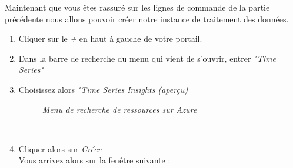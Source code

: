 Maintenant que vous êtes rassuré sur les lignes de commande de la partie précédente nous allons pouvoir créer notre instance de traitement des données.\\
\begin{enumerate}
	\item Cliquer sur le \textit{+} en haut à gauche de votre portail.
	\item Dans la barre de recherche du menu qui vient de s'ouvrir, entrer \textit{"Time Series"}
	\item Choisissez alors \textit{"Time Series Insights (aperçu)}
	
\begin{figure}[H]
\begin{center}
\end{center}
	\caption{ \textit{Menu de recherche de ressources sur Azure}}
\end{figure}\\

	\item Cliquer alors sur \textit{Créer}.\\
Vous arrivez alors sur la fenêtre  suivante :\\


\end{enumerate}
